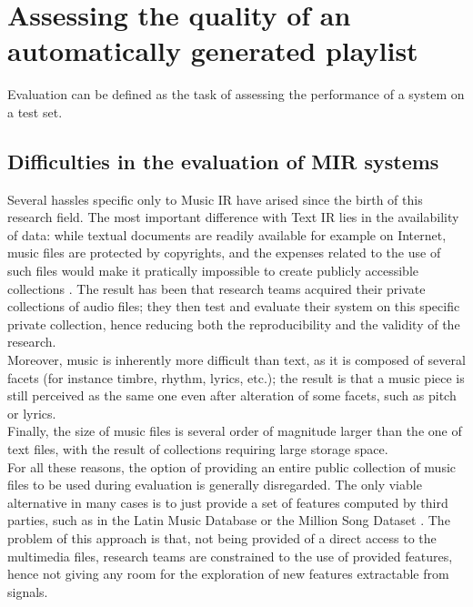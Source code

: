 \chapter{Assessing the quality of an automatically generated playlist} 

\label{Chapter3} 

Evaluation can be defined as the task of assessing the performance of a system on a test set. 

\section{Difficulties in the evaluation of MIR systems}
Several hassles specific only to Music IR have arised since the birth of this research field. The most important difference with Text IR lies in the availability of data: while textual documents are readily available for example on Internet, music files are protected by copyrights, and the expenses related to the use of such files would make it pratically impossible to create publicly accessible collections \cite{gomez14}. The result has been that research teams acquired their private collections of audio files; they then test and evaluate their system on this specific private collection, hence reducing both the reproducibility and the validity of the research. \\
Moreover, music is inherently more difficult than text, as it is composed of several facets (for instance timbre, rhythm, lyrics, etc.); the result is that a music piece is still perceived as the same one even after alteration of some facets, such as pitch or lyrics. \\ Finally, the size of music files is several order of magnitude larger than the one of text files, with the result of collections requiring large storage space.  \\
For all these reasons, the option of providing an entire public collection of music files to be used during evaluation is generally disregarded. The only viable alternative in many cases is to just provide a set of features computed by third parties, such as in the Latin Music Database \cite{latin08} or the Million Song Dataset \cite{million11}. The problem of this approach is that, not being provided of a direct access to the multimedia files, research teams are constrained to the use of provided features, hence not giving any room for the exploration of new features extractable from signals. 

